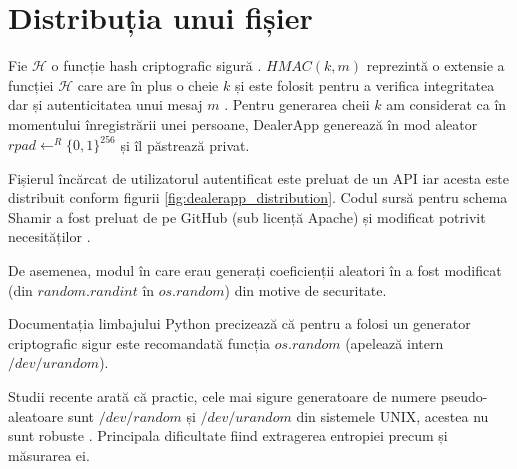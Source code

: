 \documentclass[oneside, 12pt]{book}
\begin{document}
\section{Distribuția unui fișier}

Fie $\mathcal{H}$ o funcție hash criptografic sigură \cite{Katz:2007}. $HMAC(k, m)$ reprezintă o extensie a funcției $\mathcal{H}$ care are în plus o cheie $k$ și este folosit pentru a verifica integritatea dar și autenticitatea unui mesaj $m$ \cite{krawczyk1997hmac}. Pentru generarea cheii $k$ am considerat ca în momentului înregistrării unei persoane, DealerApp generează în mod aleator $rpad \leftarrow^R \{0,1\}^{256}$ și îl păstrează privat.

Fișierul încărcat de utilizatorul autentificat este preluat de un API iar acesta este distribuit conform figurii \ref{fig:dealerapp_distribution}. Codul sursă pentru schema Shamir a fost preluat de pe GitHub (sub licență Apache) și modificat potrivit necesităților \cite{website:pysss-github}.

De asemenea, modul în care erau generați coeficienții aleatori în \cite{website:pysss-github} a fost modificat (din $random.randint$ în $os.random$) din motive de securitate.

Documentația limbajului Python precizează că pentru a folosi un generator criptografic sigur este recomandată funcția $os.random$ (apelează intern $/dev/urandom$).

Studii recente arată că practic, cele mai sigure generatoare de numere pseudo-aleatoare sunt $/dev/random$ și $/dev/urandom$ din sistemele UNIX, acestea nu sunt robuste \cite{dodis2013security}. Principala dificultate fiind extragerea entropiei precum și măsurarea ei.
\end{document}
